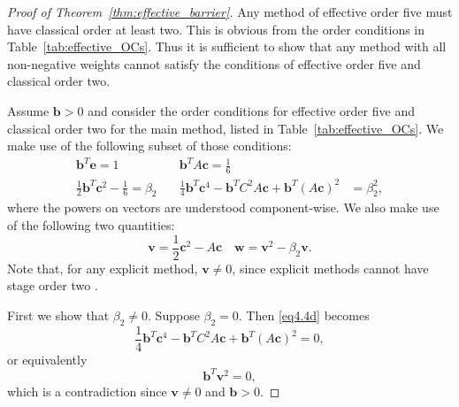 \begin{proof}[Proof of Theorem~\ref{thm:effective_barrier}]
	Any method of effective order five must have classical order at least two.
	This is obvious from the order conditions in Table~\ref{tab:effective_OCs}.
    Thus it is sufficient to show that any method with all non-negative weights
    cannot satisfy the conditions of effective order five and classical order two.

    Assume $\bm{b} > 0$ and consider the order conditions for effective order five and classical 
    order two for the main method, listed in Table~\ref{tab:effective_OCs}.  
    We make use of the following subset of those conditions:
    \begin{subequations}\label{eq:theorem_cond}
        \begin{align}
            \bm{b}^{T}\bm{e} = 1 &\quad \bm{b}^{T}A\bm{c} = \frac{1}{6} \label{eq:theorem_conda} \\
            \frac{1}{2}\bm{b}^{T}\bm{c}^{2} - \frac{1}{6} = \beta_{2} &\quad \frac{1}{4}\bm{b}^{T}\bm{c}^{4} - \bm{b}^{T}C^{2}A\bm{c} + \bm{b}^{T}(A\bm{c})^{2} &= \beta_{2}^{2}, \label{eq:theorem_condb}
        \end{align}
    \end{subequations}
    where the powers on vectors are understood component-wise. 
    We also make use of the following two quantities:
    \begin{displaymath} 
        \bm{v} = \frac{1}{2}\bm{c}^{2} - A\bm{c} \quad \bm{w} = \bm{v}^{2} - \beta_{2}\bm{v}.
    \end{displaymath}
    Note that, for any explicit method, $\bm{v}\ne 0$, since explicit methods
    cannot have stage order two \cite{Kraaijevanger1991}.

    First we show that $\beta_2 \ne 0$.  Suppose $\beta_2=0$.
    Then \eqref{eq4.4d} becomes
    \begin{equation*}
        \frac{1}{4}\bm{b}^{T}\bm{c}^{4} - \bm{b}^{T}C^{2}A\bm{c} + \bm{b}^{T}(A\bm{c})^{2} = 0,
    \end{equation*}
    or equivalently
    \begin{equation*}
        \bm{b}^{T}\bm{v}^{2} = 0,
    \end{equation*}
    which is a contradiction since $\bm{v}\ne0$ and $\bm{b}>0$.


\end{proof}
